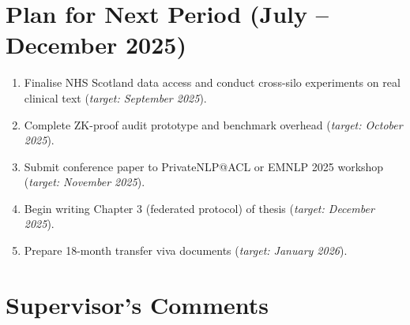 \documentclass[11pt, a4paper]{article}
\begin{document}
\section{Plan for Next Period (July – December 2025)}

\begin{enumerate}[leftmargin=*, itemsep=1pt, topsep=2pt]
  \item Finalise NHS Scotland data access and conduct cross-silo experiments on real
        clinical text (\textit{target: September 2025}).
  \item Complete ZK-proof audit prototype and benchmark overhead
        (\textit{target: October 2025}).
  \item Submit conference paper to PrivateNLP@ACL or EMNLP 2025 workshop
        (\textit{target: November 2025}).
  \item Begin writing Chapter 3 (federated protocol) of thesis
        (\textit{target: December 2025}).
  \item Prepare 18-month transfer viva documents (\textit{target: January 2026}).
\end{enumerate}

\section{Supervisor's Comments}
\end{document}
